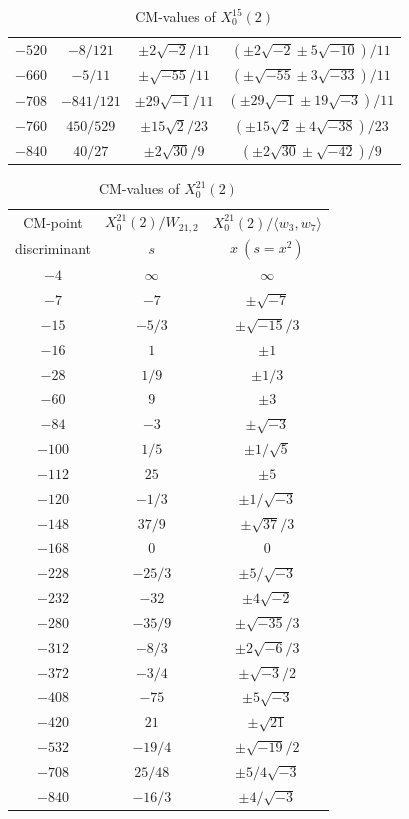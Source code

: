 \documentclass{amsart}
\theoremstyle{definition}
\def\gen#1{\langle #1\rangle}
\begin{document}
\begin{appendices}
\begin{table}
\begin{tabular}{|c|c|c|c|}
$-520$ & $-8/121$ & $\pm2\sqrt{-2}/11$
       & $(\pm2\sqrt{-2}\pm5\sqrt{-10})/11$ \\
$-660$ & $-5/11$ & $\pm\sqrt{-55}/11$
       & $(\pm\sqrt{-55}\pm3\sqrt{-33})/11$ \\
$-708$ & $-841/121$ & $\pm 29\sqrt{-1}/11$
       & $(\pm29\sqrt{-1}\pm19\sqrt{-3})/11$ \\
$-760$ & $450/529$ & $\pm15\sqrt2/23$
       & $(\pm15\sqrt2\pm4\sqrt{-38})/23$ \\
$-840$ & $40/27$ & $\pm2\sqrt{30}/9$
       & $(\pm2\sqrt{30}\pm\sqrt{-42})/9$ \\
\hline
\end{tabular}
\bigskip
\caption{CM-values of $X^{15}_0(2)$}
\end{table}
\clearpage

\renewcommand{\arraystretch}{1.5}
\tabcolsep=10pt                         
\begin{table}
\begin{tabular}{|c|c|c|}
\hline
CM-point& $X_{0}^{21}(2) /W_{21,2}$ & $X_{0}^{21}(2)/\gen{w_3,w_7}$ \\
discriminant & $s$ & $x\ (s=x^2)$ \\ \hline
$-4$ & $\infty$ & $\infty$ \\
$-7$ & $-7$ & $\pm\sqrt{-7}$ \\
$-15$ & $-5/3$ & $\pm\sqrt{-15}/3$ \\
$-16$ & $1$ & $\pm 1$ \\
$-28$ & $1/9$ & $\pm1/3$ \\
$-60$ & $9$ & $\pm3$ \\
$-84$ & $-3$ & $\pm\sqrt{-3}$ \\
$-100$ & $1/5$ & $\pm1/\sqrt5$ \\
$-112$ & $25$ & $\pm5$ \\
$-120$ & $-1/3$ & $\pm1/\sqrt{-3}$ \\
$-148$ & $37/9$ & $\pm\sqrt{37}/3$ \\
$-168$ & $0$ & $0$ \\
$-228$ & $-25/3$ & $\pm5/\sqrt{-3}$ \\
$-232$ & $-32$ & $\pm4\sqrt{-2}$ \\
$-280$ & $-35/9$ & $\pm\sqrt{-35}/3$ \\
$-312$ & $-8/3$ & $\pm2\sqrt{-6}/3$ \\
$-372$ & $-3/4$ & $\pm\sqrt{-3}/2$ \\
$-408$ & $-75$ & $\pm5\sqrt{-3}$ \\
$-420$ & $21$ & $\pm\sqrt{21}$ \\
$-532$ & $-19/4$ & $\pm\sqrt{-19}/2$ \\
$-708$ & $25/48$ & $\pm5/4\sqrt{-3}$ \\
$-840$ & $-16/3$ & $\pm4/\sqrt{-3}$ \\
\hline
\end{tabular}
\bigskip
\caption{CM-values of $X^{21}_0(2)$}
\end{table}
\clearpage


\end{appendices}
\end{document}
